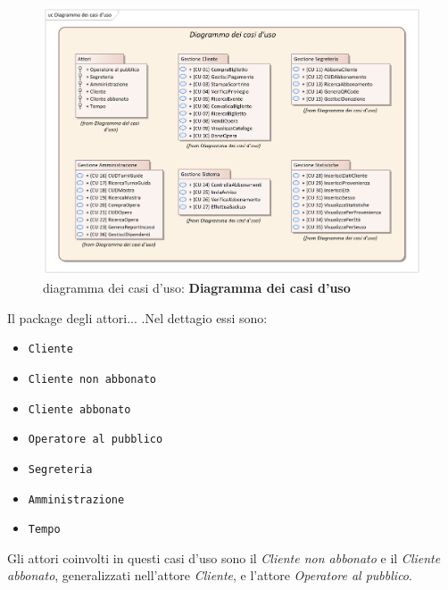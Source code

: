 \documentclass{article}
\begin{document}
\begin{figure}[h]
    \centering
    \includegraphics[width=1\textwidth]{Diagramma dei casi d'uso}
    \caption{diagramma dei casi d'uso: \textbf{Diagramma dei casi d'uso}}
    \label{fig:Diagramma dei casi d'uso}
\end{figure}



\newpage

\indent\indent Il package degli attori... .Nel dettagio essi sono:

\medskip
\begin{itemize}[itemsep=0pt]
  \item \texttt{Cliente}
  \item \texttt{Cliente non abbonato}
  \item \texttt{Cliente abbonato}
  \item \texttt{Operatore al pubblico}
  \item \texttt{Segreteria}
  \item \texttt{Amministrazione}
  \item \texttt{Tempo}
\end{itemize}

\medskip
Gli attori coinvolti in questi casi d'uso sono il \emph{Cliente non abbonato} e il \emph{Cliente abbonato}, generalizzati nell'attore \emph{Cliente}, e l'attore \emph{Operatore al pubblico}.
\end{document}

